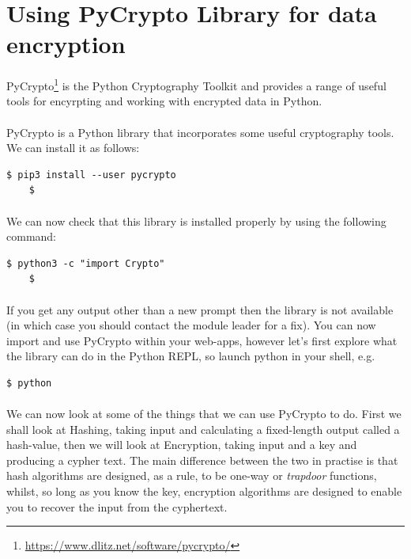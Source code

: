 \documentclass[12pt, a4paper, oneside]{book}
\begin{document}
\section{Using PyCrypto Library for data encryption}
\label{pycrypto}
\paragraph{} PyCrypto\footnote{\url{https://www.dlitz.net/software/pycrypto/}} is the Python Cryptography Toolkit and provides a range of useful tools for encyrpting and working with encrypted data in Python. 

\paragraph{} PyCrypto is a Python library that incorporates some useful cryptography tools. We can install it as follows:
\begin{lstlisting}[style=DOS]
    $ pip3 install --user pycrypto
    $
\end{lstlisting}

\paragraph{} We can now check that this library is installed properly by using the following command:
\begin{lstlisting}[style=DOS]
    $ python3 -c "import Crypto"
    $
\end{lstlisting}

\paragraph{} If you get any output other than a new prompt then the library is not available (in which case you should contact the module leader for a fix). You can now import and use PyCrypto within your web-apps, however let's first explore what the library can do in the Python REPL, so launch python in your shell, e.g.

\begin{lstlisting}[style=DOS]
    $ python
\end{lstlisting}

\paragraph{} We can now look at some of the things that we can use PyCrypto to do. First we shall look at Hashing, taking input and calculating a fixed-length output called a hash-value, then we will look at Encryption, taking input and a key and producing a cypher text. The main difference between the two in practise is that hash algorithms are designed, as a rule, to be one-way or \emph{trapdoor} functions, whilst, so long as you know the key, encryption algorithms are designed to enable you to recover the input from the cyphertext.
\end{document}
